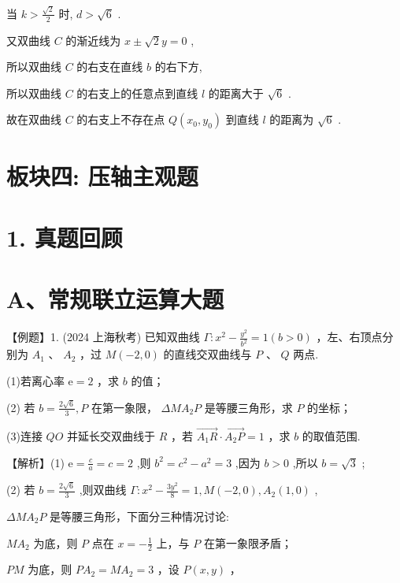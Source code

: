 \documentclass[10pt]{article}
\newcommand*\circled[1]{\tikz[baseline=(char.base)]{\node[shape=circle,draw,inner sep=1.5pt] (char) {\small #1};}}
\begin{document}
当 \(k > \frac{\sqrt{2}}{2}\) 时, \(d > \sqrt{6}\) .

又双曲线 \(C\) 的渐近线为 \(x \pm  \sqrt{2}y = 0\) ,

所以双曲线 \(C\) 的右支在直线 \(b\) 的右下方,

所以双曲线 \(C\) 的右支上的任意点到直线 \(l\) 的距离大于 \(\sqrt{6}\) .

故在双曲线 \(C\) 的右支上不存在点 \(Q\left( {{x}_{0},{y}_{0}}\right)\) 到直线 \(l\) 的距离为 \(\sqrt{6}\) .

\section*{板块四: 压轴主观题}

\section*{1. 真题回顾}

\section*{A、常规联立运算大题}

【例题】1. (2024 上海秋考) 已知双曲线 \(\Gamma  : {x}^{2} - \frac{{y}^{2}}{{b}^{2}} = 1\left( {b > 0}\right)\) ，左、右顶点分别为 \({A}_{1}\) 、 \({A}_{2}\) ，过 \(M\left( {-2,0}\right)\) 的直线交双曲线与 \(P\text{ 、 }Q\) 两点.

(1)若离心率 \(\mathrm{e} = 2\) ，求 \(b\) 的值；

(2) 若 \(b = \frac{2\sqrt{6}}{3},P\) 在第一象限， \({\Delta M}{A}_{2}P\) 是等腰三角形，求 \(P\) 的坐标；

(3)连接 \({QO}\) 并延长交双曲线于 \(R\) ，若 \(\overrightarrow{{A}_{1}R} \cdot  \overrightarrow{{A}_{2}P} = 1\) ，求 \(b\) 的取值范围.

【解析】(1) \(\mathrm{e} = \frac{c}{a} = c = 2\) ,则 \({b}^{2} = {c}^{2} - {a}^{2} = 3\) ,因为 \(b > 0\) ,所以 \(b = \sqrt{3}\) ;

(2) 若 \(b = \frac{2\sqrt{6}}{3}\) ,则双曲线 \(\Gamma  : {x}^{2} - \frac{3{y}^{2}}{8} = 1,M\left( {-2,0}\right) ,{A}_{2}\left( {1,0}\right)\) ,

\({\Delta M}{A}_{2}P\) 是等腰三角形，下面分三种情况讨论:

 \circled{1}  \(M{A}_{2}\) 为底，则 \(P\) 点在 \(x =  - \frac{1}{2}\) 上，与 \(P\) 在第一象限矛盾；

 \circled{2}  \({PM}\) 为底，则 \(P{A}_{2} = M{A}_{2} = 3\) ，设 \(P\left( {x,y}\right)\) ，
\end{document}
